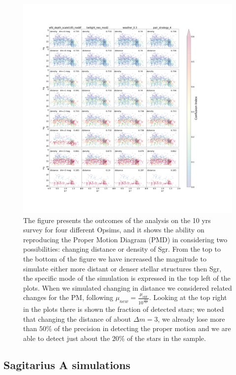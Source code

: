 \begin{figure}
\centering
\includegraphics[scale=0.28]{figures/ConfunsionIndex_10yrs.png}
\caption{The figure presents the outcomes of the analysis on the 10 yrs survey for four different Opsims, and it shows the ability on reproducing the Proper Motion Diagram (PMD) in \citet{Carlin12} considering two possibilities: changing distance or density of Sgr. From the top to the bottom of the figure we have increased the magnitude to simulate either more distant or denser stellar structures then Sgr, the specific mode of the simulation is expressed in the top left of the plots. When we simulated changing in distance we considered related changes for the PM, following $\mu_{new}=\frac{\mu_{old}}{10^{\frac{\Delta m}{5}}}$. Looking at the top right in the plots there is shown the fraction of detected stars; we noted that  changing the distance of about $\Delta m= 3$, we already lose more than $50\%$ of the precision in detecting the proper motion and we are able to detect just about the $20\%$ of the stars in the sample. }
\label{fig:Conf_Idx}
\end{figure}

\subsection{Sagitarius A simulations}

